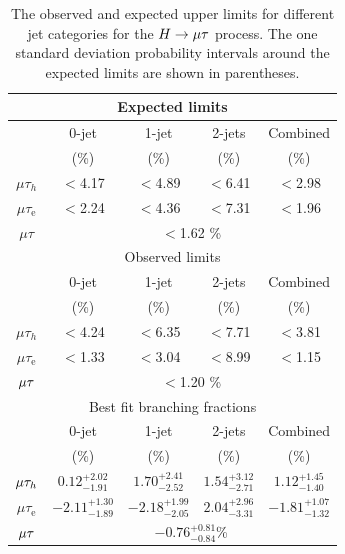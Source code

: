 \documentclass[oneside, letterpaper, oldfontcommands]{memoir}
\begin{document}
{{{\begin{table}[hbtp]
 \centering
  \caption{The observed and expected upper limits for different
    jet categories for the $H \rightarrow \mu \mathrm{\tau}$  process.
    The one standard deviation probability intervals around the expected limits are shown in parentheses.}
 \label{tab:expected_limits}
\begin{tabular}{c|c|c|c|c} \hline
\multicolumn{5}{c}{Expected limits} \\ \hline
                       &  \multicolumn{1}{c|}{0-jet}   & \multicolumn{1}{c|}{1-jet}    &  \multicolumn{1}{c|}{2-jets} & \multicolumn{1}{c}{Combined}                 \\
                       & (\%)                     & (\%)                     & (\%)  &    (\%)                  \\   \cline{2-5}
          $\mu\tau_{h}$  & $<$4.17  & $<$4.89   & $<$6.41   &   $<$2.98   \\
      $\mu\tau_{\textrm{e}}$           & $<$2.24   &  $<$4.36  &  $<$7.31  &  $<$1.96    \\ \hline
            $\mu\tau$      &        \multicolumn{4}{c}{  $<$1.62  \% }                              \\ \hline \hline
\multicolumn{5}{c}{Observed limits} \\ \hline
                       &  \multicolumn{1}{c|}{0-jet}   & \multicolumn{1}{c|}{1-jet}    &  \multicolumn{1}{c|}{2-jets} & \multicolumn{1}{c}{Combined}                 \\
                       & (\%)                     & (\%)                     & (\%)  &    (\%)                  \\   \cline{2-5}
          $\mu\tau_{h}$  & $<$4.24  & $<$6.35   & $<$7.71   &   $<$3.81   \\
      $\mu\tau_{\textrm{e}}$           & $<$1.33   &  $<$3.04  &  $<$8.99  &  $<$1.15    \\ \hline
            $\mu\mathrm{\tau}$      &        \multicolumn{4}{c}{  $<$1.20  \% }                              \\ \hline \hline
\multicolumn{5}{c}{Best fit branching fractions} \\ \hline
                       &  \multicolumn{1}{c|}{0-jet}   & \multicolumn{1}{c|}{1-jet}    &  \multicolumn{1}{c|}{2-jets} & \multicolumn{1}{c}{Combined}                 \\
                       & (\%)                     & (\%)                     & (\%)  &    (\%)                  \\   \cline{2-5}
      \rule[-5pt]{0pt}{17pt}
      $\mu\mathrm{\tau}_{h}$  &  $0.12^{+2.02}_{-1.91}$  &  $1.70^{+2.41}_{-2.52}$  &  $1.54^{+3.12}_{-2.71}$  &   $1.12^{+1.45}_{-1.40}$   \\
      \rule[-5pt]{0pt}{17pt}
      $\mu\tau_{\textrm{e}}$    &  $-2.11^{+1.30}_{-1.89}$  &  $-2.18^{+1.99}_{-2.05}$  &  $2.04^{+2.96}_{-3.31}$ & $-1.81_{-1.32}^{+1.07}$  \\ \hline
      \rule[-5pt]{0pt}{17pt}
      $\mu\mathrm{\tau}$  & \multicolumn{4}{c}{ $-0.76^{+0.81}_{-0.84}$\% }   \\ \hline
  \end{tabular}
\end{table}


}}}
\end{document}
